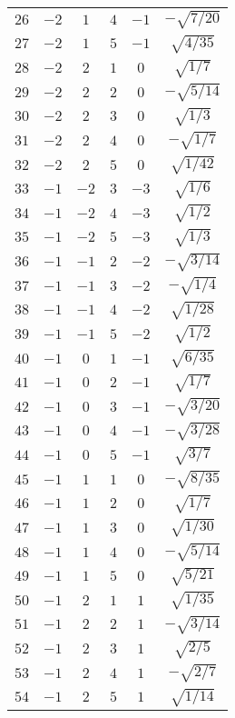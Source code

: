 \begin{table}
\begin{center}
\begin{tabular}{|c|c|c|c|c|c|}
$26$ & $-2$ & $1$ & $4$ & $-1$ & $-\sqrt{7/20}$ \\ 
$27$ & $-2$ & $1$ & $5$ & $-1$ & $\sqrt{4/35}$ \\ 
$28$ & $-2$ & $2$ & $1$ & $0$ & $\sqrt{1/7}$ \\ 
$29$ & $-2$ & $2$ & $2$ & $0$ & $-\sqrt{5/14}$ \\ 
$30$ & $-2$ & $2$ & $3$ & $0$ & $\sqrt{1/3}$ \\ 
$31$ & $-2$ & $2$ & $4$ & $0$ & $-\sqrt{1/7}$ \\ 
$32$ & $-2$ & $2$ & $5$ & $0$ & $\sqrt{1/42}$ \\ 
$33$ & $-1$ & $-2$ & $3$ & $-3$ & $\sqrt{1/6}$ \\ 
$34$ & $-1$ & $-2$ & $4$ & $-3$ & $\sqrt{1/2}$ \\ 
$35$ & $-1$ & $-2$ & $5$ & $-3$ & $\sqrt{1/3}$ \\ 
$36$ & $-1$ & $-1$ & $2$ & $-2$ & $-\sqrt{3/14}$ \\ 
$37$ & $-1$ & $-1$ & $3$ & $-2$ & $-\sqrt{1/4}$ \\ 
$38$ & $-1$ & $-1$ & $4$ & $-2$ & $\sqrt{1/28}$ \\ 
$39$ & $-1$ & $-1$ & $5$ & $-2$ & $\sqrt{1/2}$ \\ 
$40$ & $-1$ & $0$ & $1$ & $-1$ & $\sqrt{6/35}$ \\ 
$41$ & $-1$ & $0$ & $2$ & $-1$ & $\sqrt{1/7}$ \\ 
$42$ & $-1$ & $0$ & $3$ & $-1$ & $-\sqrt{3/20}$ \\ 
$43$ & $-1$ & $0$ & $4$ & $-1$ & $-\sqrt{3/28}$ \\ 
$44$ & $-1$ & $0$ & $5$ & $-1$ & $\sqrt{3/7}$ \\ 
$45$ & $-1$ & $1$ & $1$ & $0$ & $-\sqrt{8/35}$ \\ 
$46$ & $-1$ & $1$ & $2$ & $0$ & $\sqrt{1/7}$ \\ 
$47$ & $-1$ & $1$ & $3$ & $0$ & $\sqrt{1/30}$ \\ 
$48$ & $-1$ & $1$ & $4$ & $0$ & $-\sqrt{5/14}$ \\ 
$49$ & $-1$ & $1$ & $5$ & $0$ & $\sqrt{5/21}$ \\ 
$50$ & $-1$ & $2$ & $1$ & $1$ & $\sqrt{1/35}$ \\ 
$51$ & $-1$ & $2$ & $2$ & $1$ & $-\sqrt{3/14}$ \\ 
$52$ & $-1$ & $2$ & $3$ & $1$ & $\sqrt{2/5}$ \\ 
$53$ & $-1$ & $2$ & $4$ & $1$ & $-\sqrt{2/7}$ \\ 
$54$ & $-1$ & $2$ & $5$ & $1$ & $\sqrt{1/14}$ \\ 

\end{tabular}
\end{center}
\end{table}
